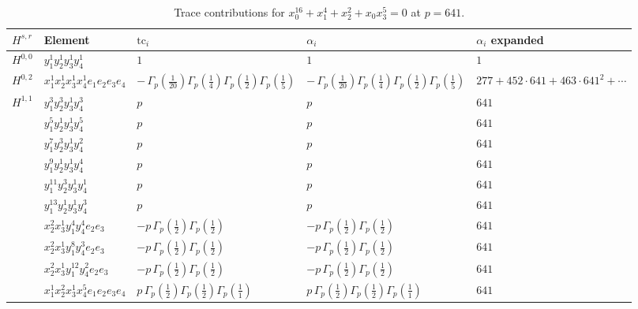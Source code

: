 \documentclass[11pt]{article}
\begin{document}
\begin{table}[ht]
\centering
\caption{Trace contributions for $x_0^{16} + x_1^{4} + x_2^{2} + x_0 x_3^{5} = 0$ at $p=641$.}\label{tab:deformed-42}
\renewcommand{\arraystretch}{1.1}
{\scriptsize
\begin{tabular}{@{}lllll@{}}
\toprule
$H^{s,r}$ & Element & $\mathrm{tc}_i$ & $\alpha_i$ & $\alpha_i$ expanded \\
\midrule
$H^{0,0}$ & $y_{1}^{1} y_{2}^{1} y_{3}^{1} y_{4}^{1}$ & $1$ & $1$ & $1$ \\
\midrule
$H^{0,2}$ & $x_{1}^{1} x_{2}^{1} x_{3}^{1} x_{4}^{1}  e_{1} e_{2} e_{3} e_{4}$ & $- \, \Gamma_p \left( \frac{1}{20} \right) \Gamma_p \left( \frac{1}{4} \right) \Gamma_p \left( \frac{1}{2} \right) \Gamma_p \left( \frac{1}{5} \right)$ & $- \, \Gamma_p \left( \frac{1}{20} \right) \Gamma_p \left( \frac{1}{4} \right) \Gamma_p \left( \frac{1}{2} \right) \Gamma_p \left( \frac{1}{5} \right)$ & $277{+}452{\cdot}641{+}463{\cdot}641^{2}{+}\cdots$ \\
\midrule
$H^{1,1}$ & $y_{1}^{3} y_{2}^{3} y_{3}^{1} y_{4}^{3}$ & $p \,$ & $p \,$ & $641$ \\
 & $y_{1}^{5} y_{2}^{1} y_{3}^{1} y_{4}^{5}$ & $p \,$ & $p \,$ & $641$ \\
 & $y_{1}^{7} y_{2}^{3} y_{3}^{1} y_{4}^{2}$ & $p \,$ & $p \,$ & $641$ \\
 & $y_{1}^{9} y_{2}^{1} y_{3}^{1} y_{4}^{4}$ & $p \,$ & $p \,$ & $641$ \\
 & $y_{1}^{11} y_{2}^{3} y_{3}^{1} y_{4}^{1}$ & $p \,$ & $p \,$ & $641$ \\
 & $y_{1}^{13} y_{2}^{1} y_{3}^{1} y_{4}^{3}$ & $p \,$ & $p \,$ & $641$ \\
 & $x_{2}^{2} x_{3}^{1} y_{1}^{4} y_{4}^{4} e_{2} e_{3}$ & $- p \, \Gamma_p \left( \frac{1}{2} \right) \Gamma_p \left( \frac{1}{2} \right)$ & $- p \, \Gamma_p \left( \frac{1}{2} \right) \Gamma_p \left( \frac{1}{2} \right)$ & $641$ \\
 & $x_{2}^{2} x_{3}^{1} y_{1}^{8} y_{4}^{3} e_{2} e_{3}$ & $- p \, \Gamma_p \left( \frac{1}{2} \right) \Gamma_p \left( \frac{1}{2} \right)$ & $- p \, \Gamma_p \left( \frac{1}{2} \right) \Gamma_p \left( \frac{1}{2} \right)$ & $641$ \\
 & $x_{2}^{2} x_{3}^{1} y_{1}^{12} y_{4}^{2} e_{2} e_{3}$ & $- p \, \Gamma_p \left( \frac{1}{2} \right) \Gamma_p \left( \frac{1}{2} \right)$ & $- p \, \Gamma_p \left( \frac{1}{2} \right) \Gamma_p \left( \frac{1}{2} \right)$ & $641$ \\
 & $x_{1}^{1} x_{2}^{2} x_{3}^{1} x_{4}^{5}  e_{1} e_{2} e_{3} e_{4}$ & $p \, \Gamma_p \left( \frac{1}{2} \right) \Gamma_p \left( \frac{1}{2} \right) \Gamma_p \left( \frac{1}{1} \right)$ & $p \, \Gamma_p \left( \frac{1}{2} \right) \Gamma_p \left( \frac{1}{2} \right) \Gamma_p \left( \frac{1}{1} \right)$ & $641$ \\

\end{tabular}}
\end{table}
\end{document}
